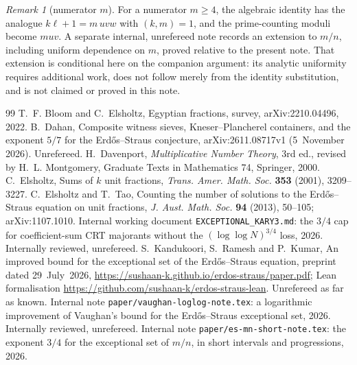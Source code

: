 \documentclass[10pt,reqno]{amsart}
\theoremstyle{remark}
\newtheorem{remark}[theorem]{Remark}
\begin{document}
\begin{remark}[numerator $m$]
For a numerator $m\geq4$, the algebraic identity has the analogue
$k\ell+1=m\,uvw$ with $(k,m)=1$, and the prime-counting moduli become
$muv$.  A separate internal, unrefereed note \cite[Thm.~A]{MN} records an
extension to $m/n$, including uniform dependence on $m$, proved relative
to the present note.  That extension is conditional here on the companion
argument: its analytic uniformity requires additional work, does not
follow merely from the identity substitution, and is not claimed or
proved in this note.
\end{remark}

\begin{thebibliography}{99}
T.~F. Bloom and C.~Elsholtz, Egyptian fractions, survey,
arXiv:2210.04496, 2022.
B.~Dahan, Composite witness sieves, Kneser--Plancherel containers, and the
exponent $5/7$ for the Erd\H{o}s--Straus conjecture, arXiv:2611.08717v1
(5~November 2026).  Unrefereed.
H.~Davenport, \emph{Multiplicative Number Theory}, 3rd ed., revised by
H.~L. Montgomery, Graduate Texts in Mathematics 74, Springer, 2000.
C.~Elsholtz, Sums of $k$ unit fractions, \emph{Trans. Amer. Math. Soc.}
\textbf{353} (2001), 3209--3227.
C.~Elsholtz and T.~Tao, Counting the number of solutions to the
Erd\H{o}s--Straus equation on unit fractions, \emph{J. Aust. Math. Soc.}
\textbf{94} (2013), 50--105; arXiv:1107.1010.
Internal working document \texttt{EXCEPTIONAL\_KARY3.md}: the $3/4$ cap
for coefficient-sum CRT majorants without the $(\log\log N)^{3/4}$ loss,
2026.  Internally reviewed, unrefereed.
S.~Kandukoori, S.~Ramesh and P.~Kumar, An improved bound for the
exceptional set of the Erd\H{o}s--Straus equation, preprint dated
29~July~2026, \url{https://sushaan-k.github.io/erdos-straus/paper.pdf};
Lean formalisation \url{https://github.com/sushaan-k/erdos-straus-lean}.
Unrefereed as far as known.
Internal note \texttt{paper/vaughan-loglog-note.tex}: a logarithmic
improvement of Vaughan's bound for the Erd\H{o}s--Straus exceptional set,
2026.  Internally reviewed, unrefereed.
Internal note \texttt{paper/es-mn-short-note.tex}: the exponent $3/4$ for
the exceptional set of $m/n$, in short intervals and progressions, 2026.

\end{thebibliography}
\end{document}
